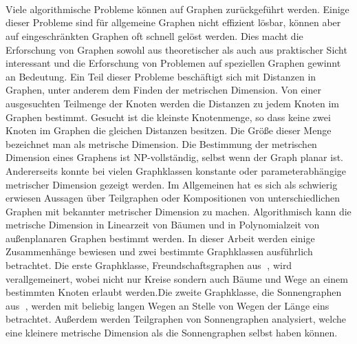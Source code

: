 \thispagestyle{empty}
~
\newpage

\thispagestyle{empty}
\section*{}

Viele algorithmische Probleme können auf Graphen zurückgeführt werden. Einige dieser Probleme sind für allgemeine Graphen nicht effizient lösbar, können aber auf eingeschränkten Graphen oft schnell gelöst werden. Dies macht die Erforschung von Graphen sowohl aus theoretischer als auch aus praktischer Sicht interessant und die Erforschung von Problemen auf speziellen Graphen gewinnt an Bedeutung. Ein Teil dieser Probleme beschäftigt sich mit Distanzen in Graphen, unter anderem dem Finden der metrischen Dimension.\newline\newline
Von einer ausgesuchten Teilmenge der Knoten werden die Distanzen zu jedem Knoten im Graphen bestimmt. Gesucht ist die kleinste Knotenmenge, so dass keine zwei Knoten im Graphen die gleichen Distanzen besitzen. Die Größe dieser Menge bezeichnet man als metrische Dimension. Die Bestimmung der metrischen Dimension eines Graphens ist NP-vollständig, selbst wenn der Graph planar ist.\newline\newline 
Andererseits konnte bei vielen Graphklassen konstante oder parameterabhängige metrischer Dimension gezeigt werden.\newline\newline 
Im Allgemeinen hat es sich als schwierig erwiesen Aussagen über Teilgraphen oder Kompositionen von unterschiedlichen Graphen mit bekannter metrischer Dimension zu machen. Algorithmisch kann die metrische Dimension in Linearzeit von Bäumen und in Polynomialzeit von außenplanaren Graphen bestimmt werden.\newline\newline
In dieser Arbeit werden einige Zusammenhänge bewiesen und zwei bestimmte Graphklassen ausführlich betrachtet.\newline\newline 
Die erste Graphklasse, Freundschaftsgraphen aus \grqq$\;$\cite{amal}, wird verallgemeinert, wobei nicht nur Kreise sondern auch Bäume und Wege an einem bestimmten Knoten erlaubt werden.\newline Die zweite Graphklasse, die Sonnengraphen aus \grqq$\;$\cite{bases}, werden mit beliebig langen Wegen an Stelle von Wegen der Länge eins betrachtet. Außerdem werden Teilgraphen von Sonnengraphen analysiert, welche eine kleinere metrische Dimension als die Sonnengraphen selbst haben können.\newline\newline 
